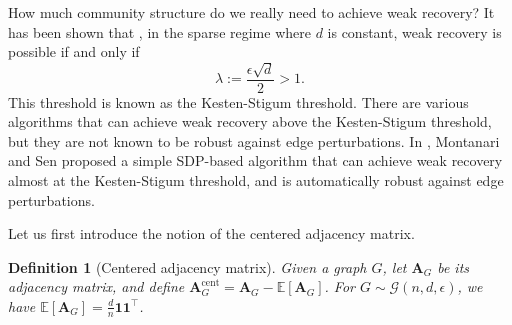 \documentclass[11pt, titlepage]{article} %
\numberwithin{equation}{section}
\newtheorem{definition}{Definition}
\theoremstyle{definition}
\numberwithin{theorem}{section}
\numberwithin{lemma}{section}
\numberwithin{corollary}{section}
\numberwithin{proposition}{section}
\numberwithin{definition}{section}
\numberwithin{remark}{section}
\begin{document}
How much community structure do we really need to achieve weak recovery? It has been shown that 
\cite{MNS15}, in the sparse regime where $d$ is constant, weak recovery is possible if and only if 
\[\lambda := \frac{\epsilon \sqrt{d}}{2} > 1.\]
This threshold is known as the Kesten-Stigum threshold. There are various algorithms that can achieve
weak recovery above the Kesten-Stigum threshold, but they are not known to be robust against edge
perturbations. In \cite{MS16}, Montanari and Sen proposed a simple SDP-based algorithm that can achieve
weak recovery almost at the Kesten-Stigum threshold, and is automatically robust against edge perturbations.

Let us first introduce the notion of the centered adjacency matrix.
\begin{definition}[Centered adjacency matrix]
Given a graph $G$, let $\bm{A}_G$ be its adjacency matrix, and define $\bm{A}_G^{\mathrm{cent}} = \bm{A}_G - \mathbb{E}[\bm{A}_G]$.
For $G \sim \mathcal{G}(n, d, \epsilon)$, we have $\mathbb{E}[\bm{A}_G] = \frac{d}{n}\bm{1}\bm{1}^\top$.
\end{definition}
\end{document}

